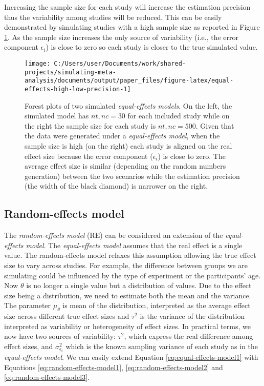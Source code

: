 \documentclass[
  man,floatsintext]{apa6}
\begin{document}
\normalsize

Increasing the sample size for each study will increase the estimation precision thus the variability among studies will be reduced. This can be easily demonstrated by simulating studies with a high sample size as reported in Figure \ref{fig:equal-effects-high-low-precision}. As the sample size increases the only source of variability (i.e., the error component \(\epsilon_{i}\)) is close to zero so each study is closer to the true simulated value.

\scriptsize

\begin{figure}[H]

{\centering \texttt{[image: C:/Users/user/Documents/work/shared-projects/simulating-meta-analysis/documents/output/paper\_files/figure-latex/equal-effects-high-low-precision-1]} 

}

\caption{Forest plots of two simulated \emph{equal-effects models}. On the left, the simulated model has \(nt,nc = 30\) for each included study while on the right the sample size for each study is \(nt,nc = 500\). Given that the data were generated under a \emph{equal-effects model}, when the sample size is high (on the right) each study is aligned on the real effect size because the error component (\(\epsilon_{i}\)) is close to zero. The average effect size is similar (depending on the random numbers generation) between the two scenarios while the estimation precision (the width of the black diamond) is narrower on the right.}\label{fig:equal-effects-high-low-precision}
\end{figure}

\normalsize

\subsection{Random-effects model}\label{re-model}

The \emph{random-effects model} (RE) can be considered an extension of the \emph{equal-effects model}. The \emph{equal-effects model} assumes that the real effect is a single value. The random-effects model relaxes this assumption allowing the true effect size to vary across studies. For example, the difference between groups we are simulating could be influenced by the type of experiment or the participants' age.
Now \(\theta\) is no longer a single value but a distribution of values. Due to the effect size being a distribution, we need to estimate both the mean and the variance. The parameter \(\mu_{\theta}\) is mean of the distribution, interpreted as the average effect size across different true effect sizes and \(\tau^{2}\) is the variance of the distribution interpreted as variability or heterogeneity of effect sizes. In practical terms, we now have two sources of variability: \(\tau^{2}\), which express the real difference among effect sizes, and \(\sigma_{\epsilon_i}^{2}\) which is the known sampling variance of each study as in the \emph{equal-effects model}. We can easily extend Equation \eqref{eq:equal-effects-model1} with Equations \eqref{eq:random-effects-model1}, \eqref{eq:random-effects-model2} and \eqref{eq:random-effects-model3}.
\end{document}
